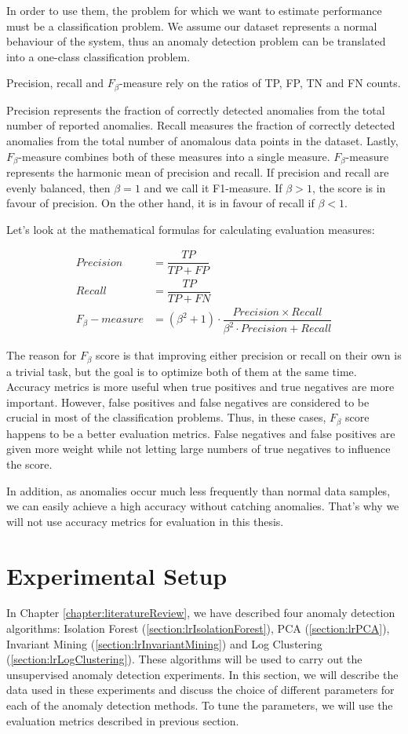 In order to use them, the problem for which we want to estimate performance must be a classification problem. We assume our dataset represents a normal behaviour of the system, thus an anomaly detection problem can be translated into a one-class classification problem. 

Precision, recall and $F_{\beta}$-measure rely on the ratios of TP, FP, TN and FN counts. 

Precision represents the fraction of correctly detected anomalies from the total number of reported anomalies. Recall measures the fraction of correctly detected anomalies from the total number of anomalous data points in the dataset. Lastly, $F_{\beta}$-measure combines both of these measures into a single measure. $F_{\beta}$-measure represents the harmonic mean of precision and recall. If precision and recall are evenly balanced, then $\beta = 1$ and we call it F1-measure. If $\beta > 1$, the score is in favour of precision. On the other hand, it is in favour of recall if $\beta < 1$. 

Let's look at the mathematical formulas for calculating evaluation measures:

\begin{align}
    Precision &= \dfrac{TP}{TP + FP} \\
    Recall &= \dfrac{TP}{TP + FN} \\
    F_{\beta}-measure &= (\beta^2 + 1) \cdot \dfrac{Precision \times Recall }{\beta^2 \cdot Precision + Recall} 
\end{align}

The reason for $F_{\beta}$ score is that improving either precision or recall on their own is a trivial task, but the goal is to optimize both of them at the same time. Accuracy metrics is more useful when true positives and true negatives are more important. However, false positives and false negatives are considered to be crucial in most of the classification problems. Thus, in these cases, $F_{\beta}$ score happens to be a better evaluation metrics. False negatives and false positives are given more weight while not letting large numbers of true negatives to influence the score.

In addition, as anomalies occur much less frequently than normal data samples, we can easily achieve a high accuracy without catching anomalies. That's why we will not use accuracy metrics for evaluation in this thesis.

\section{Experimental Setup}
\label{section:experimental-setup}
In Chapter \ref{chapter:literatureReview}, we have described four anomaly detection algorithms: Isolation Forest (\ref{section:lrIsolationForest}), PCA (\ref{section:lrPCA}), Invariant Mining (\ref{section:lrInvariantMining}) and Log Clustering (\ref{section:lrLogClustering}). These algorithms will be used to carry out the unsupervised anomaly detection experiments. In this section, we will describe the data used in these experiments and discuss the choice of different parameters for each of the anomaly detection methods. To tune the parameters, we will use the evaluation metrics described in previous section.

